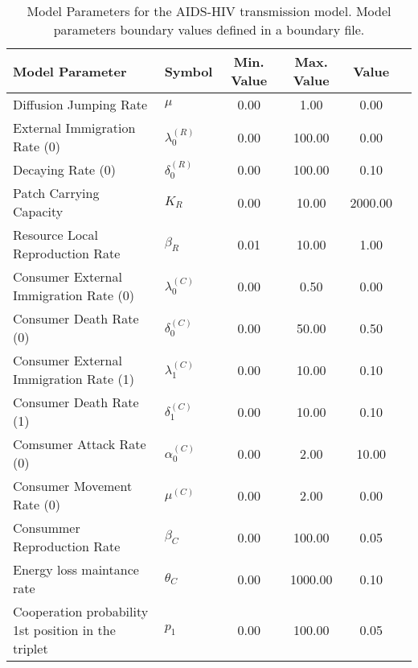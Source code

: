 \begin{table}
\centering
\begin{tabular}{p{5cm}lcccc}
{\bf Model Parameter} & {\bf Symbol} & {\bf Min. Value} & {\bf Max. Value} & {\bf Value}\\
\hline\hline
Diffusion Jumping Rate & $\mu$ & 0.00 & 1.00 & 0.00\\
External Immigration Rate (0) & $\lambda^{(R)}_0$ & 0.00 & 100.00 & 0.00\\
Decaying Rate (0) & $\delta^{(R)}_0$ & 0.00 & 100.00 & 0.10\\
Patch Carrying Capacity & $K_R$ & 0.00 & 10.00 & 2000.00\\
Resource Local Reproduction Rate & $\beta_R$ & 0.01 & 10.00 & 1.00\\
Consumer External Immigration Rate (0) & $\lambda^{(C)}_0$ & 0.00 & 0.50 & 0.00\\
Consumer Death Rate (0) & $\delta^{(C)}_0$ & 0.00 & 50.00 & 0.50\\
Consumer External Immigration Rate (1) & $\lambda^{(C)}_1$ & 0.00 & 10.00 & 0.10\\
Consumer Death Rate (1) & $\delta^{(C)}_1$ & 0.00 & 10.00 & 0.10\\
Comsumer Attack Rate (0) & $\alpha^{(C)}_0$ & 0.00 & 2.00 & 10.00\\
Consumer Movement Rate (0) & $\mu^{(C)}$ & 0.00 & 2.00 & 0.00\\
Consummer Reproduction Rate & $\beta_C$ & 0.00 & 100.00 & 0.05\\
Energy loss maintance rate & $\theta_C$ & 0.00 & 1000.00 & 0.10\\
Cooperation probability 1st position in the triplet & $p_1$ & 0.00 & 100.00 & 0.05\\
\hline\hline
\end{tabular}
\caption{Model Parameters for the AIDS-HIV transmission model. Model parameters boundary values defined in a boundary file.}
\end{table}
